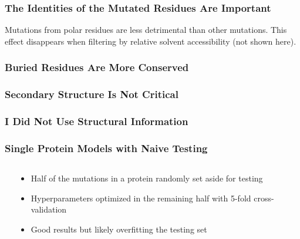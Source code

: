 \documentclass[10pt, british]{beamer}
\begin{document}
\begin{frame}
	\frametitle{The Identities of the Mutated Residues Are Important}
	Mutations from polar residues are less detrimental than other mutations.
	This effect disappears when filtering by relative solvent accessibility (not shown here).
	\vfill%
	\centering%
	{%
		\let\bfseries\sbseries%
		
	}
\end{frame}

\begin{frame}
	\frametitle{Buried Residues Are More Conserved}
	\centering%
	{%
		\let\bfseries\sbseries%
		
	}
\end{frame}

\begin{frame}
	\frametitle{Secondary Structure Is Not Critical}
	\centering%
	{%
		\let\bfseries\sbseries%
		
	}
\end{frame}

\begin{frame}
	\frametitle{I Did Not Use Structural Information}
	\begin{figure}
		
	\end{figure}
\end{frame}

\begin{frame}
	\frametitle{Single Protein Models with Naive Testing}
	\begin{columns}[c]
		\begin{column}{.6\textwidth}
			\centering%
			\vspace{1em}
			{%
				\let\bfseries\sbseries%
				
			}
		\end{column}
		\begin{column}{.4\textwidth}
			\begin{itemize}
				\item Half of the mutations in a protein randomly set aside for testing
				\item Hyperparameters optimized in the remaining half with 5-fold cross-validation
				\item Good results but likely overfitting the testing set
			\end{itemize}
		\end{column}
	\end{columns}
\end{frame}
\end{document}
